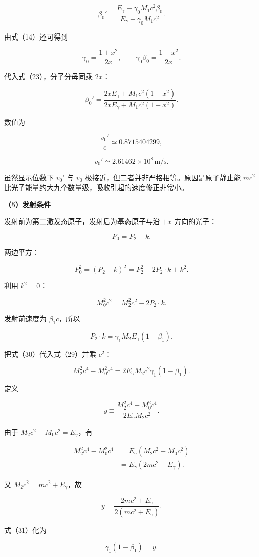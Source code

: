 \documentclass[12pt,a4paper,UTF8]{ctexart}
\begin{document}
\[
\boxed{
\beta_0'
=\frac{E_\gamma+\gamma_0M_1c^2\beta_0}
{E_\gamma+\gamma_0M_1c^2}
}.
\tag{23}
\]

由式（14）还可得到

\[
\gamma_0=\frac{1+x^2}{2x},
\qquad
\gamma_0\beta_0=\frac{1-x^2}{2x}.
\tag{24}
\]

代入式（23），分子分母同乘 \(2x\)：

\[
\boxed{
\beta_0'
=\frac{2xE_\gamma+M_1c^2(1-x^2)}
{2xE_\gamma+M_1c^2(1+x^2)}
}.
\tag{25}
\]

数值为

\[
\boxed{
\frac{v_0'}c\simeq0.8715404299
},
\tag{26}
\]

\[
\boxed{
v_0'\simeq2.61462\times10^8\,\mathrm{m/s}
}.
\tag{27}
\]

虽然显示位数下 \(v_0'\) 与 \(v_0\)
极接近，但二者并非严格相等。原因是原子静止能 \(mc^2\)
比光子能量约大九个数量级，吸收引起的速度修正非常小。

\textbf{（5）发射条件}

发射前为第二激发态原子，发射后为基态原子与沿 \(+x\) 方向的光子：

\[
P_0=P_2-k.
\tag{28}
\]

两边平方：

\[
P_0^2=(P_2-k)^2=P_2^2-2P_2\cdot k+k^2.
\]

利用 \(k^2=0\)：

\[
M_0^2c^2=M_2^2c^2-2P_2\cdot k.
\tag{29}
\]

发射前速度为 \(\beta_1c\)，所以

\[
P_2\cdot k
=\gamma_1M_2E_\gamma(1-\beta_1).
\tag{30}
\]

把式（30）代入式（29）并乘 \(c^2\)：

\[
M_2^2c^4-M_0^2c^4
=2E_\gamma M_2c^2\gamma_1(1-\beta_1).
\tag{31}
\]

定义

\[
y\equiv
\frac{M_2^2c^4-M_0^2c^4}
{2E_\gamma M_2c^2}.
\tag{32}
\]

由于 \(M_2c^2-M_0c^2=E_\gamma\)，有

\[
\begin{aligned}
M_2^2c^4-M_0^2c^4
&=E_\gamma(M_2c^2+M_0c^2)\\
&=E_\gamma(2mc^2+E_\gamma).
\end{aligned}
\]

又 \(M_2c^2=mc^2+E_\gamma\)，故

\[
\boxed{
y=\frac{2mc^2+E_\gamma}
{2(mc^2+E_\gamma)}
}.
\tag{33}
\]

式（31）化为

\[
\gamma_1(1-\beta_1)=y.
\tag{34}
\]
\end{document}
